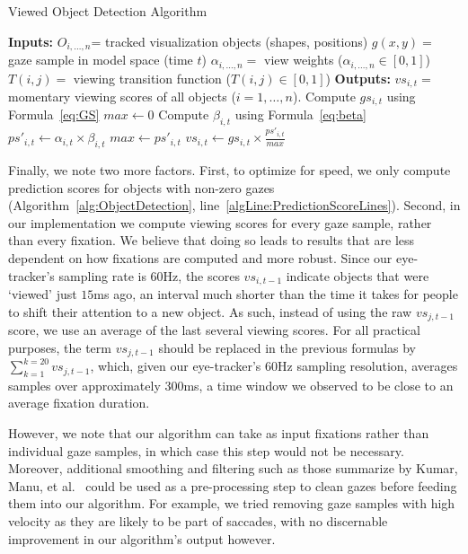 \begin{algorithm}
\caption{Viewed Object Detection Algorithm}
\label{alg:ObjectDetection}
\begin{algorithmic}[1]
\State \textbf{Inputs: } 
\Statex $O_{i, \ldots, n}$= tracked visualization objects (shapes, positions)
\Statex $g(x,y) = $ gaze sample in model space (time $t$)
\Statex $\alpha_{i, \ldots, n} = $ view weights ($\alpha_{i, \ldots, n} \in [0,1]$)
\Statex $T(i,j) = $ viewing transition function ($T(i,j) \in [0,1]$)
\State \textbf{Outputs:}
\Statex $vs_{i,t} = $ momentary viewing scores of all objects ($i = 1, \ldots, n$). 
	\State Compute $gs_{i,t}$	using Formula~\ref{eq:GS}
\EndFor
\State $max \gets 0$
	 \label{algLine:PredictionScoreLines}
		\State Compute $\beta_{i,t}$	using Formula~\ref{eq:beta}
		\State $ps'_{i,t} \gets \alpha_{i,t} \times \beta_{i,t}$
			\State $max \gets ps'_{i,t}$
		\EndIf
	\EndIf
\EndFor
{}
	\State $vs_{i,t} \gets gs_{i,t} \times \frac{ps'_{i,t}}{max} $
\EndFor
\end{algorithmic}
\end{algorithm}

Finally, we note two more factors. First, to optimize for speed, we only compute prediction scores for objects with non-zero gazes (Algorithm~\ref{alg:ObjectDetection}, line~\ref{algLine:PredictionScoreLines}). Second, in our implementation we compute viewing scores for every gaze sample, rather than every fixation. We believe that doing so leads to results that are less dependent on how fixations are computed and more robust. Since our eye-tracker's sampling rate is $60$Hz, the scores $vs_{i, t-1}$ indicate objects that were `viewed' just $15$ms ago, an interval much shorter than the time it takes for people to shift their attention to a new object. As such, instead of using the raw $vs_{j,t-1}$ score, we use an average of the last several viewing scores. For all practical purposes, the term $vs_{j,t-1}$ should be replaced in the previous formulas by $ \sum_{k=1}^{k=20}{vs_{j,t-1}}$, which, given our eye-tracker's 60Hz sampling resolution, averages samples over approximately 300ms, a time window we observed to be close to an average fixation duration.  

However, we note that our algorithm can take as input fixations rather than individual gaze samples, in which case this step would not be necessary. Moreover, additional smoothing and filtering such as those summarize by Kumar, Manu, et al.~\cite{kumar2008improving} could be used as a pre-processing step to clean gazes before feeding them into our algorithm. For example, we tried removing gaze samples with high velocity as they are likely to be part of saccades, with no discernable improvement in our algorithm's output however. 

